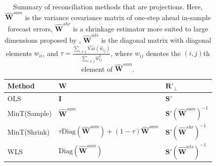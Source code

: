 \documentclass[12pt]{article}
\def\var{\text{Var}}
\theoremstyle{definition}
\begin{document}
\begin{table}[!h]
	\caption{Summary of reconciliation methods that are projections. Here, $\hat{\bm{W}}^{sam}$ is the variance covariance matrix of one-step ahead in-sample forecast errors, $\hat{\bm{W}}^{shr}$ is a shrinkage estimator more suited to large dimensions proposed by \citet{Schafer2005}, $\hat{\bm{W}}^{wls}$ is the diagonal matrix with diagonal elements $w_{ii}$, and $\tau = \frac{\sum_{i \neq j}\hat{\var}(\hat{w}_{ij})}{\sum_{i \neq j}{\hat{w}}^2_{ij}}$, where $w_{ij}$ denotes the $(i,j)$th element of $\hat{\bm{W}}^{sam}$.}\label{table:ReconMethods}
	\centering
	\begin{tabular}{lll}
		\toprule
		\textbf{Method} & \textbf{$\bm{W}$} & \textbf{ $\bm{R}'_\bot$}      \\
		\midrule
		OLS             &
		$\bm{I}$  &
		$\bm{S}'$  \\
		MinT(Sample)    &
		$\hat{\bm{W}}^{sam}$ &
		$\bm{S}'(\hat{\bm{W}}^{sam})^{-1}$ \\
		MinT(Shrink)    &
		$\tau\text{Diag}(\hat{\bm{W}}^{sam}) + (1-\tau)\hat{\bm{W}}^{sam}$ &
		$\bm{S}'(\hat{\bm{W}}^{shr})^{-1}$ \\
		WLS       &
		$\text{Diag}(\hat{\bm{W}}^{sam})$ &
		$\bm{S}'(\hat{\bm{W}}^{wls})^{-1}$ \\
		\bottomrule
	\end{tabular}
\end{table}

%
\end{document}

